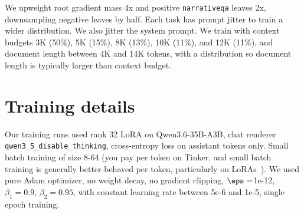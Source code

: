 We upweight root gradient mass 4x and positive \texttt{narrativeqa} leaves 2x, downsampling negative leaves by half. Each task has prompt jitter to train a wider distribution. We also jitter the system prompt. We train with context budgets 3K (50\%), 5K (15\%), 8K (13\%), 10K (11\%), and 12K (11\%), and document length between 4K and 14K tokens, with a distribution so document length is typically larger than context budget.

\section{Training details}
\label{app:train}

Our training runs used rank 32 LoRA on Qwen3.6-35B-A3B, chat renderer \verb|qwen3_5_disable_thinking|, cross-entropy loss on assistant tokens only. Small batch training of size 8-64 (you pay per token on Tinker, and small batch training is generally better-behaved per token, particularly on LoRAs~\citep{marek2025smallbatch,schulman2025lora,masters2018small,keskar2017largebatch}). We used pure Adam optimizer, no weight decay, no gradient clipping, $\eps=$1e-12, $\beta_1 = 0.9$, $\beta_2 = 0.95$, with constant learning rate between 5e-6 and 1e-5, single epoch training.
